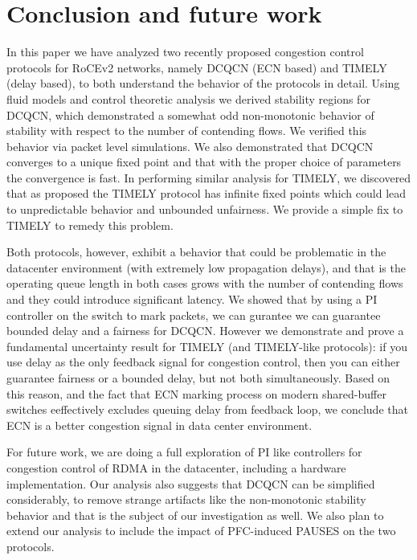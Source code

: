 \section{Conclusion and future work}
In this paper we have analyzed two recently proposed congestion control
protocols for RoCEv2 networks, namely DCQCN (ECN based) and TIMELY (delay
based), to both understand the behavior of the protocols in detail.  Using fluid
models and control theoretic analysis we derived stability regions for DCQCN,
which demonstrated a somewhat odd non-monotonic behavior of stability with
respect to the number of contending flows. We verified this behavior via packet
level simulations. We also demonstrated that DCQCN converges to a unique fixed
point and that with the proper choice of parameters the convergence is fast. In
performing similar analysis for TIMELY, we discovered that as proposed the
TIMELY protocol has infinite fixed points which could lead to unpredictable
behavior and unbounded unfairness. We provide a simple fix to TIMELY to remedy
this problem.

Both protocols, however, exhibit a behavior that could be problematic in the
datacenter environment (with extremely low propagation delays), and that is the
operating queue length in both cases grows with the number of contending flows
and they could introduce significant latency. We showed that by using a PI
controller on the switch to mark packets, we can gurantee  we can guarantee
bounded delay and a fairness for DCQCN.  However we demonstrate and prove a
fundamental uncertainty result for TIMELY (and TIMELY-like protocols): if you
use delay as the only feedback signal for congestion control, then you can
either guarantee fairness or a bounded delay, but not both simultaneously. Based
on this reason, and the fact that ECN marking process on modern shared-buffer
switches eeffectively excludes queuing delay from feedback loop, we conclude
that ECN is a better congestion signal in data center environment. 

For future work, we are doing a full exploration of PI like controllers for
congestion control of RDMA in the datacenter, including a hardware
implementation. Our analysis also suggests that DCQCN can be simplified
considerably, to remove strange artifacts like the non-monotonic stability
behavior and that is the subject of our investigation as well.  We also plan to
extend our analysis to include the impact of PFC-induced PAUSES on the two
protocols.


